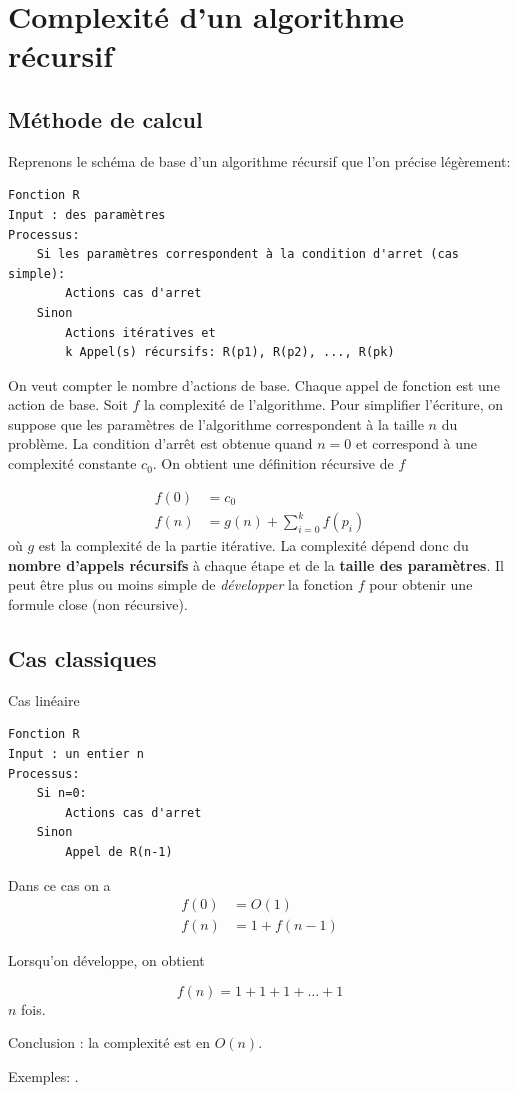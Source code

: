 \documentclass{../cours}
\begin{document}
\section{Complexité d'un algorithme récursif}

\subsection{Méthode de calcul}

Reprenons le schéma de base d'un algorithme récursif  que l'on précise légèrement:

\begin{lstlisting}
Fonction R
Input : des paramètres
Processus:
    Si les paramètres correspondent à la condition d'arret (cas simple):
        Actions cas d'arret
    Sinon
        Actions itératives et 
        k Appel(s) récursifs: R(p1), R(p2), ..., R(pk)
\end{lstlisting}

On veut compter le nombre d'actions de base. Chaque appel de fonction est une action de base. Soit $f$ la complexité de l'algorithme. Pour simplifier l'écriture, on suppose que les paramètres de l'algorithme correspondent à la taille $n$ du problème. La condition d'arrêt est obtenue quand $n=0$ et correspond à une complexité constante $c_0$. On obtient une définition récursive de $f$

\begin{align}
f(0) &= c_0 \\
f(n) &= g(n) + \sum_{i=0}^k f(p_i)
\end{align}
où $g$ est la complexité de la partie itérative. La complexité dépend donc du \textbf{nombre d'appels récursifs} à chaque étape et de la \textbf{taille des paramètres}. Il peut être plus ou moins simple de \emph{développer} la fonction $f$ pour obtenir une formule close (non récursive).

\subsection{Cas classiques}

\begin{Example}
Cas linéaire

\begin{lstlisting}
Fonction R
Input : un entier n
Processus:
    Si n=0:
        Actions cas d'arret
    Sinon
        Appel de R(n-1)
\end{lstlisting}

Dans ce cas on a 
\begin{align}
f(0) &= O(1) \\
f(n) &= 1 + f(n-1)
\end{align}

Lorsqu'on développe, on obtient

\begin{equation}
f(n) = 1 + 1 + 1 + \dots + 1 
\end{equation}
$n$ fois.

Conclusion : la complexité est en $O(n)$.

Exemples: .
\end{Example} 
\end{document}
